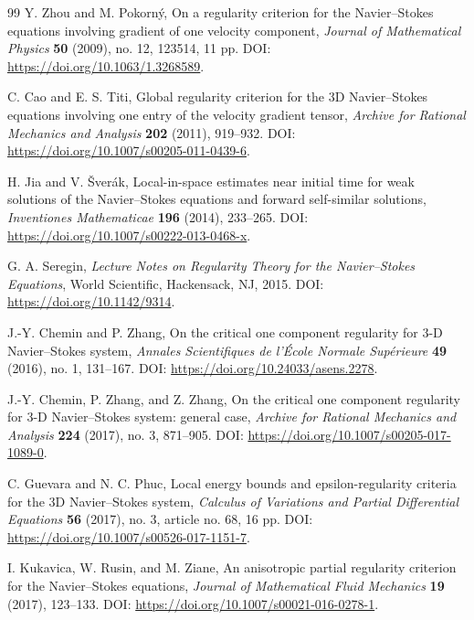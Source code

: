 \documentclass[11pt]{article}
\numberwithin{equation}{section}
\theoremstyle{plain}
\theoremstyle{definition}
\theoremstyle{remark}
\begin{document}
\begin{thebibliography}{99}
	Y. Zhou and M. Pokorn\'y,
	On a regularity criterion for the Navier--Stokes equations involving gradient of one velocity component,
	\newblock \emph{Journal of Mathematical Physics} \textbf{50} (2009), no. 12, 123514, 11 pp.
	\newblock DOI: \url{https://doi.org/10.1063/1.3268589}.

	C. Cao and E. S. Titi,
	Global regularity criterion for the 3D Navier--Stokes equations involving one entry of the velocity gradient tensor,
	\newblock \emph{Archive for Rational Mechanics and Analysis} \textbf{202} (2011), 919--932.
	\newblock DOI: \url{https://doi.org/10.1007/s00205-011-0439-6}.

	H. Jia and V. \v{S}ver\'ak,
	Local-in-space estimates near initial time for weak solutions of the Navier--Stokes equations and forward self-similar solutions,
	\newblock \emph{Inventiones Mathematicae} \textbf{196} (2014), 233--265.
	\newblock DOI: \url{https://doi.org/10.1007/s00222-013-0468-x}.

	G. A. Seregin,
	\emph{Lecture Notes on Regularity Theory for the Navier--Stokes Equations},
	World Scientific, Hackensack, NJ, 2015.
	\newblock DOI: \url{https://doi.org/10.1142/9314}.

	J.-Y. Chemin and P. Zhang,
	On the critical one component regularity for 3-D Navier--Stokes system,
	\newblock \emph{Annales Scientifiques de l'\'Ecole Normale Sup\'erieure} \textbf{49} (2016), no. 1, 131--167.
	\newblock DOI: \url{https://doi.org/10.24033/asens.2278}.

	J.-Y. Chemin, P. Zhang, and Z. Zhang,
	On the critical one component regularity for 3-D Navier--Stokes system: general case,
	\newblock \emph{Archive for Rational Mechanics and Analysis} \textbf{224} (2017), no. 3, 871--905.
	\newblock DOI: \url{https://doi.org/10.1007/s00205-017-1089-0}.

	C. Guevara and N. C. Phuc,
	Local energy bounds and epsilon-regularity criteria for the 3D Navier--Stokes system,
	\newblock \emph{Calculus of Variations and Partial Differential Equations} \textbf{56} (2017), no. 3, article no. 68, 16 pp.
	\newblock DOI: \url{https://doi.org/10.1007/s00526-017-1151-7}.

	I. Kukavica, W. Rusin, and M. Ziane,
	An anisotropic partial regularity criterion for the Navier--Stokes equations,
	\newblock \emph{Journal of Mathematical Fluid Mechanics} \textbf{19} (2017), 123--133.
	\newblock DOI: \url{https://doi.org/10.1007/s00021-016-0278-1}.


\end{thebibliography}
\end{document}
